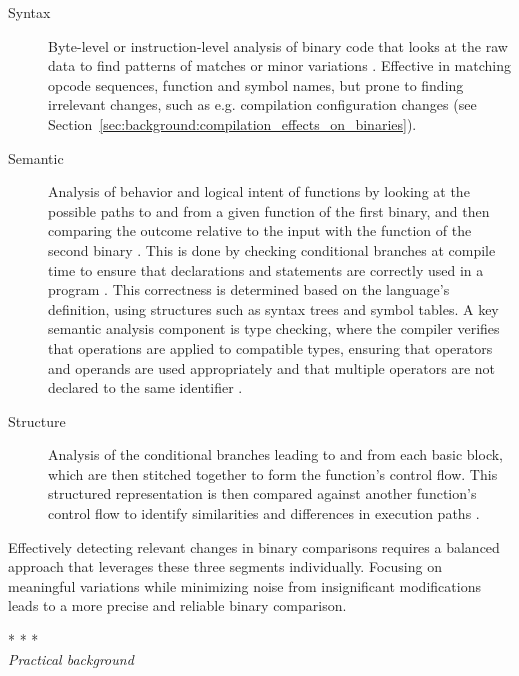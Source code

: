 \begin{description}
    \item[Syntax] Byte-level or instruction-level analysis of binary code that looks at the raw data to find patterns of matches or minor variations \cite{A_Survey_of_Binary_Code_Similarity_Detection_Techniques}. Effective in matching opcode sequences, function and symbol names, but prone to finding irrelevant changes, such as e.g. compilation configuration changes (see Section~\ref{sec:background:compilation_effects_on_binaries}).
    
    \item[Semantic] Analysis of behavior and logical intent of functions by looking at the possible paths to and from a given function of the first binary, and then comparing the outcome relative to the input with the function of the second binary \cite{binhunt_official}. This is done by checking conditional branches at compile time to ensure that declarations and statements are correctly used in a program \cite{wilhelm2013compiler}. This correctness is determined based on the language's definition, using structures such as syntax trees and symbol tables. A key semantic analysis component is type checking, where the compiler verifies that operations are applied to compatible types, ensuring that operators and operands are used appropriately and that multiple operators are not declared to the same identifier \cite{wilhelm2013compiler}.

\newpage

    \item[Structure] Analysis of the conditional branches leading to and from each basic block, which are then stitched together to form the function’s control flow. This structured representation is then compared against another function’s control flow to identify similarities and differences in execution paths \cite{binhunt_official}.
\end{description}


Effectively detecting relevant changes in binary comparisons requires a balanced approach that leverages these three segments individually. Focusing on meaningful variations while minimizing noise from insignificant modifications leads to a more precise and reliable binary comparison.

\begin{center}
    * * *\\
    \Large\textit{Practical background}
\end{center}


